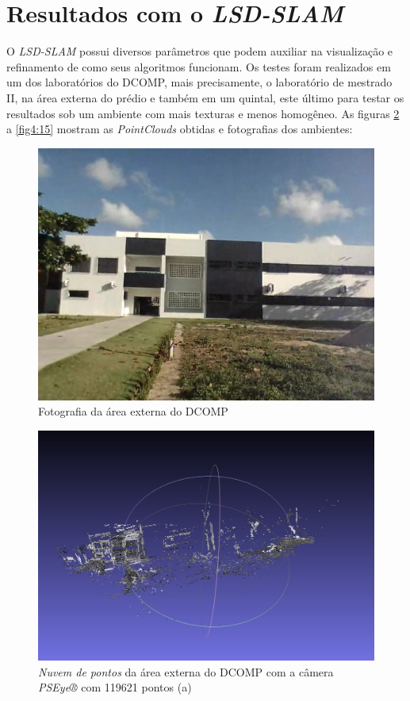 \section{Resultados com o \textit{LSD-SLAM}}

O \textit{LSD-SLAM} possui diversos parâmetros que podem auxiliar na visualização e refinamento de como seus algoritmos funcionam. Os testes foram realizados em um dos laboratórios do DCOMP, mais precisamente, o laboratório de mestrado II, na área externa do prédio e também em um quintal, este último para testar os resultados sob um ambiente com mais texturas e menos homogêneo. As figuras \ref{fig4:5} a \ref{fig4:15} mostram as \textit{PointClouds} obtidas e fotografias dos ambientes:

\begin{figure}[H]
	\centering
		\includegraphics[width= \textwidth]{Imagens/figura4-7.jpg}
	\caption{Fotografia da área externa do DCOMP}
	\label{fig4:7}
\end{figure}

\begin{figure}[H]
	\centering
		\includegraphics[width= \textwidth]{Imagens/figura4-5.jpg}
	\caption{\textit{Nuvem de pontos} da área externa do DCOMP com a câmera \textit{PSEye®} com 119621 pontos (a)}
	\label{fig4:5}
\end{figure}

